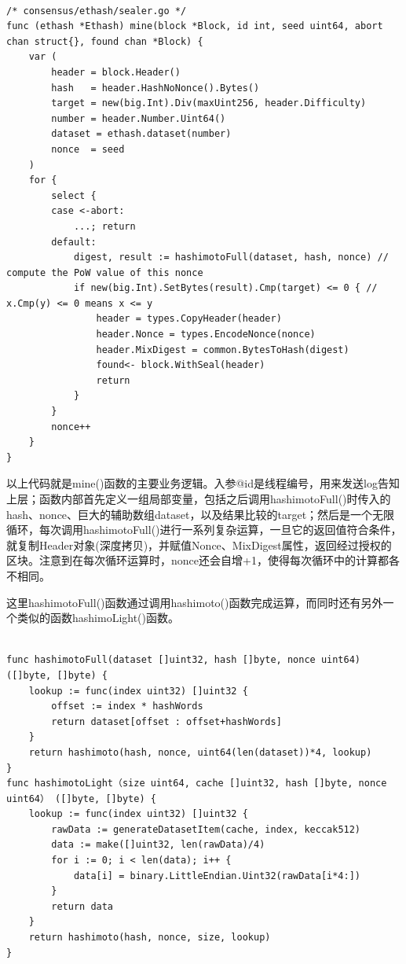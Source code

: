 \documentclass[UTF8]{ctexart}
\begin{document}
\begin{lstlisting}

/* consensus/ethash/sealer.go */
func (ethash *Ethash) mine(block *Block, id int, seed uint64, abort chan struct{}, found chan *Block) {
    var (
        header = block.Header()
        hash   = header.HashNoNonce().Bytes()
        target = new(big.Int).Div(maxUint256, header.Difficulty)
        number = header.Number.Uint64()
        dataset = ethash.dataset(number)
        nonce  = seed
    )
    for {
        select {
        case <-abort:
            ...; return
        default:
            digest, result := hashimotoFull(dataset, hash, nonce) // compute the PoW value of this nonce
            if new(big.Int).SetBytes(result).Cmp(target) <= 0 { // x.Cmp(y) <= 0 means x <= y
                header = types.CopyHeader(header)
                header.Nonce = types.EncodeNonce(nonce)
                header.MixDigest = common.BytesToHash(digest)
                found<- block.WithSeal(header)
                return
            }
        }
        nonce++
    }
}

\end{lstlisting}


以上代码就是mine()函数的主要业务逻辑。入参@id是线程编号，用来发送log告知上层；函数内部首先定义一组局部变量，包括之后调用hashimotoFull()时传入的hash、nonce、巨大的辅助数组dataset，以及结果比较的target；然后是一个无限循环，每次调用hashimotoFull()进行一系列复杂运算，一旦它的返回值符合条件，就复制Header对象(深度拷贝)，并赋值Nonce、MixDigest属性，返回经过授权的区块。注意到在每次循环运算时，nonce还会自增+1，使得每次循环中的计算都各不相同。

这里hashimotoFull()函数通过调用hashimoto()函数完成运算，而同时还有另外一个类似的函数hashimoLight()函数。

\begin{lstlisting}

func hashimotoFull(dataset []uint32, hash []byte, nonce uint64) ([]byte, []byte) {
    lookup := func(index uint32) []uint32 {
        offset := index * hashWords
        return dataset[offset : offset+hashWords]
    }
    return hashimoto(hash, nonce, uint64(len(dataset))*4, lookup)
}
func hashimotoLight（size uint64, cache []uint32, hash []byte, nonce uint64） ([]byte, []byte) {
    lookup := func(index uint32) []uint32 {
        rawData := generateDatasetItem(cache, index, keccak512)
        data := make([]uint32, len(rawData)/4)
        for i := 0; i < len(data); i++ {
            data[i] = binary.LittleEndian.Uint32(rawData[i*4:])
        }
        return data
    }
    return hashimoto(hash, nonce, size, lookup)
}

\end{lstlisting}
\end{document}
